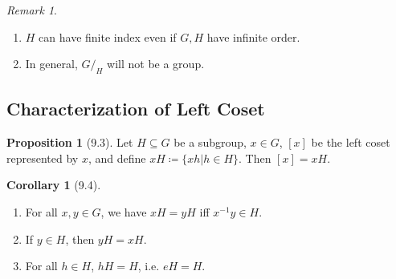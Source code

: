 \documentclass{article}
\newcommand{\coleq}{\coloneqq}
\newcommand{\inverse}[1]{#1^{-1}}
\theoremstyle{definition}
\newtheorem*{cor}{Corollary}
\newtheorem*{prop}{Proposition}
\theoremstyle{remark}
\newtheorem*{rmk}{Remark}
\begin{document}
{{            \begin{rmk}\hfill
                \begin{enumerate}
                    \item $H$ can have finite index even if $G,H$ have infinite order.
                    \item In general, $G/_H$ will not be a group.
                \end{enumerate}
            \end{rmk}
        }
            
        \subsection*{Characterization of Left Coset}{
            \begin{prop}[9.3]
                Let $H \subseteq G$ be a subgroup, $x \in G$, $[x]$ be the left coset represented by $x$, and define $xH \coleq \{xh|h\in H\}$. Then $[x]=xH$.
            \end{prop}
            
            \begin{cor}[9.4]\hfill
                \begin{enumerate}
                    \item For all $x,y \in G$, we have $xH=yH$ iff $\inverse{x}y\in H$.
                    \item If $y\in H$, then $yH=xH$.
                    \item For all $h\in H$, $hH=H$, i.e. $eH=H$.
                \end{enumerate}
            \end{cor}
        }
    }
    
\end{document}
